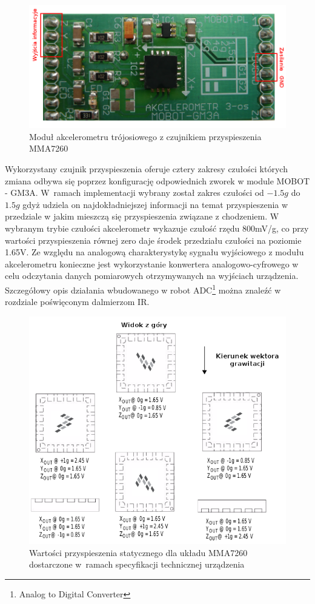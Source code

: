 \begin{figure}[ht!]
 \centering
 \includegraphics[width=\textwidth]{../images/ch04/gm3a_view.png}
 \caption{Moduł akcelerometru trójosiowego z czujnikiem przyspieszenia MMA7260}
 \label{fig:AccView}
\end{figure}
\newpage
Wykorzystany czujnik przyspieszenia oferuje cztery zakresy czułości których
zmiana odbywa się poprzez konfigurację odpowiednich zworek w module MOBOT -
GM3A. W~ramach implementacji wybrany został zakres czułości od $-1.5g$ do $1.5g$ gdyż
udziela on najdokładniejszej informacji na temat przyspieszenia w przedziale w
jakim mieszczą się przyspieszenia związane z chodzeniem. W wybranym trybie
czułości akcelerometr wykazuje czułość rzędu 800mV/g, co przy wartości
przyspieszenia równej zero daje środek przedziału czułości na poziomie 1.65V.
Ze względu na analogową charakterystykę sygnału wyjściowego z modułu
akcelerometru konieczne jest wykorzystanie konwertera analogowo-cyfrowego w
celu odczytania danych pomiarowych otrzymywanych na wyjściach urządzenia.
Szczegółowy opis działania wbudowanego w robot ADC\footnote{Analog to Digital
Converter} można znaleźć w rozdziale poświęconym dalmierzom IR. 

\begin{figure}[ht!]
 \centering
 \includegraphics[width=\textwidth]{../images/ch04/mma7260_datasheet.png}
 \caption{Wartości przyspieszenia statycznego dla układu MMA7260 dostarczone w~ramach specyfikacji technicznej urządzenia\cite{MMA7260DataSheet}}
 \label{fig:MMADataSheetStaticAcc}
\end{figure}

